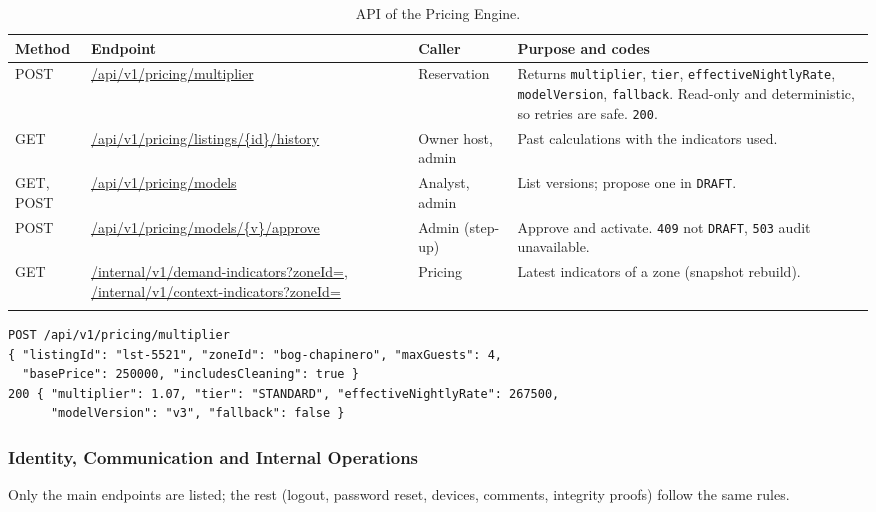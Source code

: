 \begin{longtable}{@{}L{1.5cm}L{4.8cm}L{2.3cm}L{5.0cm}@{}}
\toprule
\textbf{Method} & \textbf{Endpoint} & \textbf{Caller} & \textbf{Purpose and codes} \\
\midrule
\endhead
POST & \url{/api/v1/pricing/multiplier} & Reservation &
  Returns \texttt{multiplier}, \texttt{tier}, \texttt{effective\allowbreak Nightly\allowbreak Rate},
  \texttt{modelVersion}, \texttt{fallback}. Read-only and deterministic, so
  retries are safe. \texttt{200}. \\
GET & \url{/api/v1/pricing/listings/{id}/history} & Owner host, admin &
  Past calculations with the indicators used. \\
GET, POST & \url{/api/v1/pricing/models} & Analyst, admin &
  List versions; propose one in \texttt{DRAFT}. \\
POST & \url{/api/v1/pricing/models/{v}/approve} & Admin (step-up) &
  Approve and activate. \texttt{409} not \texttt{DRAFT}, \texttt{503} audit
  unavailable. \\
GET & \url{/internal/v1/demand-indicators?zoneId=}, \url{/internal/v1/context-indicators?zoneId=} &
  Pricing & Latest indicators of a zone (snapshot rebuild). \\
\bottomrule
\caption{API of the Pricing Engine.}
\label{tab:price-api}
\end{longtable}

{\footnotesize
\begin{verbatim}
POST /api/v1/pricing/multiplier
{ "listingId": "lst-5521", "zoneId": "bog-chapinero", "maxGuests": 4,
  "basePrice": 250000, "includesCleaning": true }
200 { "multiplier": 1.07, "tier": "STANDARD", "effectiveNightlyRate": 267500,
      "modelVersion": "v3", "fallback": false }
\end{verbatim}
}
\endgroup

\begingroup
\setlength{\emergencystretch}{3em}
\subsubsection{Identity, Communication and Internal Operations}
\label{sec:id-api}

Only the main endpoints are listed; the rest (logout, password reset, devices,
comments, integrity proofs) follow the same rules.

